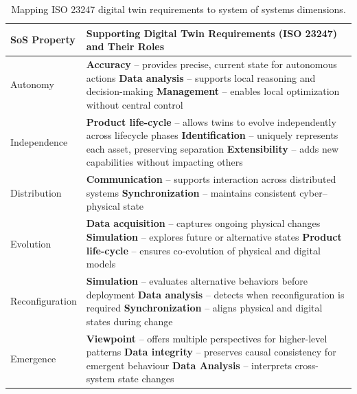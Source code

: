 \begin{table}[ht]
\centering
\caption{Mapping ISO 23247 digital twin requirements to system of systems dimensions.}
\label{tab:dt-sos-mapping}
\small
\renewcommand{\arraystretch}{1.15}
\begin{tabularx}{\textwidth}{p{} X}
\hline
\textbf{SoS Property} & \textbf{Supporting Digital Twin Requirements (ISO 23247) and Their Roles} \\
\hline

Autonomy &
\textbf{Accuracy} -- provides precise, current state for autonomous actions\newline
\textbf{Data analysis} -- supports local reasoning and decision-making\newline
\textbf{Management} -- enables local optimization without central control
\\

Independence &
\textbf{Product life-cycle} -- allows twins to evolve independently across lifecycle phases\newline
\textbf{Identification} -- uniquely represents each asset, preserving separation\newline
\textbf{Extensibility} -- adds new capabilities without impacting others
\\

Distribution &
\textbf{Communication} -- supports interaction across distributed systems\newline
\textbf{Synchronization} -- maintains consistent cyber--physical state
\\

Evolution &
\textbf{Data acquisition} -- captures ongoing physical changes\newline
\textbf{Simulation} -- explores future or alternative states\newline
\textbf{Product life-cycle} -- ensures co-evolution of physical and digital models
\\

Reconfiguration &
\textbf{Simulation} -- evaluates alternative behaviors before deployment\newline
\textbf{Data analysis} -- detects when reconfiguration is required\newline
\textbf{Synchronization} -- aligns physical and digital states during change
\\

Emergence &
\textbf{Viewpoint} -- offers multiple perspectives for higher-level patterns\newline
\textbf{Data integrity} -- preserves causal consistency for emergent behaviour\newline
\textbf{Data Analysis} -- interprets cross-system state changes
\\


\end{tabularx}
\end{table}
